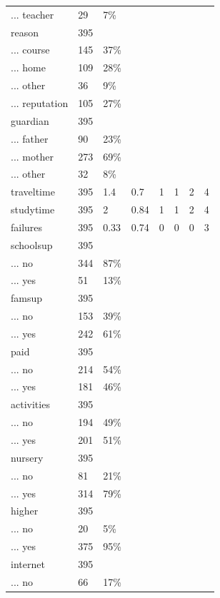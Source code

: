 \documentclass[
  11pt,
]{article}
\begin{document}
\begin{table}
\begin{tabular}[t]{llllllll}
... teacher & 29 & 7\% &  &  &  &  & \\
\addlinespace
reason & 395 &  &  &  &  &  & \\
... course & 145 & 37\% &  &  &  &  & \\
... home & 109 & 28\% &  &  &  &  & \\
... other & 36 & 9\% &  &  &  &  & \\
... reputation & 105 & 27\% &  &  &  &  & \\
\addlinespace
guardian & 395 &  &  &  &  &  & \\
... father & 90 & 23\% &  &  &  &  & \\
... mother & 273 & 69\% &  &  &  &  & \\
... other & 32 & 8\% &  &  &  &  & \\
traveltime & 395 & 1.4 & 0.7 & 1 & 1 & 2 & 4\\
\addlinespace
studytime & 395 & 2 & 0.84 & 1 & 1 & 2 & 4\\
failures & 395 & 0.33 & 0.74 & 0 & 0 & 0 & 3\\
schoolsup & 395 &  &  &  &  &  & \\
... no & 344 & 87\% &  &  &  &  & \\
... yes & 51 & 13\% &  &  &  &  & \\
\addlinespace
famsup & 395 &  &  &  &  &  & \\
... no & 153 & 39\% &  &  &  &  & \\
... yes & 242 & 61\% &  &  &  &  & \\
paid & 395 &  &  &  &  &  & \\
... no & 214 & 54\% &  &  &  &  & \\
\addlinespace
... yes & 181 & 46\% &  &  &  &  & \\
activities & 395 &  &  &  &  &  & \\
... no & 194 & 49\% &  &  &  &  & \\
... yes & 201 & 51\% &  &  &  &  & \\
nursery & 395 &  &  &  &  &  & \\
\addlinespace
... no & 81 & 21\% &  &  &  &  & \\
... yes & 314 & 79\% &  &  &  &  & \\
higher & 395 &  &  &  &  &  & \\
... no & 20 & 5\% &  &  &  &  & \\
... yes & 375 & 95\% &  &  &  &  & \\
\addlinespace
internet & 395 &  &  &  &  &  & \\
... no & 66 & 17\% &  &  &  &  & \\

\end{tabular}
\end{table}
\end{document}
